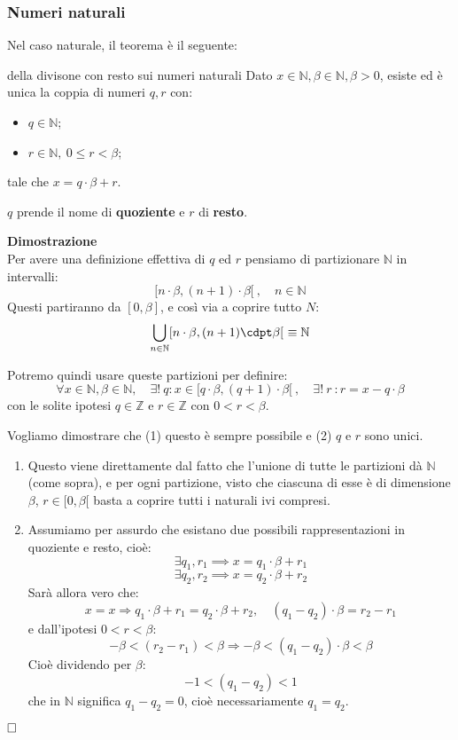 \documentclass[a4paper,11pt]{article}
\begin{document}
\subsubsection{Numeri naturali}
Nel caso naturale, il teorema è il seguente:
\begin{theorem}{della divisone con resto sui numeri naturali}
	Dato $x \in \mathbb{N}, \beta \in \mathbb{N}, \beta > 0$, esiste ed è unica la coppia di numeri $q,r$ con:
	\begin{itemize}
		\item $q \in \mathbb{N}$;
		\item $r \in \mathbb{N}, \ 0 \leq r < \beta$;
	\end{itemize}
	tale che $x = q \cdot \beta + r$.
\end{theorem}
$q$ prende il nome di \textbf{quoziente} e $r$ di \textbf{resto}.

\par\medskip
\noindent
\textbf{\textsf{Dimostrazione}} \\
Per avere una definizione effettiva di $q$ ed $r$ pensiamo di partizionare  $\mathbb{N}$ in intervalli:
$$
[n \cdot \beta, (n+1) \cdot \beta[ \ , \quad n \in \mathbb{N}
$$
Questi partiranno da $[0, \beta]$, e così via a coprire tutto $N$:
$$
\bigcup_{n \in \mathbb{N}} [n \cdot \beta, (n+1) \cdpt \beta[ \ \equiv \mathbb{N}
$$

Potremo quindi usare queste partizioni per definire:
$$ \forall x \in \mathbb{N}, \beta \in \mathbb{N}, \quad \exists ! \ q : x \in [ q \cdot \beta, (q+1) \cdot \beta [ \ , \quad \exists ! \ r \ : r = x - q \cdot \beta $$
con le solite ipotesi $q \in \mathbb{Z}$ e $r \in \mathbb{Z}$ con $0 < r < \beta$.

Vogliamo dimostrare che (1) questo è sempre possibile e (2) $q$ e $r$ sono unici.
\begin{enumerate}
	\item Questo viene direttamente dal fatto che l'unione di tutte le partizioni dà $\mathbb{N}$ (come sopra), e per ogni partizione, visto che ciascuna di esse è di dimensione $\beta$, $r \in [0, \beta[$ basta a coprire tutti i naturali ivi compresi.
	\item Assumiamo per assurdo che esistano due possibili rappresentazioni in quoziente e resto, cioè:
		$$
		\exists q_1, r_1 \implies x = q_1 \cdot \beta + r_1
		$$
		$$
		\exists q_2, r_2 \implies x = q_2 \cdot \beta + r_2
		$$
		Sarà allora vero che:
		$$
		x = x \Rightarrow  q_1 \cdot \beta + r_1 = 	q_2 \cdot \beta + r_2, \quad (q_1 - q_2) \cdot \beta = r_2 - r_1 $$
		e dall'ipotesi $0 < r < \beta$:
		$$ -\beta < (r_2 - r_1) < \beta \Rightarrow -\beta < (q_1 - q_2) \cdot \beta < \beta $$
		Cioè dividendo per $\beta$:
		$$ -1 < (q_1 - q_2) < 1 $$
		che in $\mathbb{N}$ significa $q_1 - q_2 = 0$, cioè necessariamente $q_1 = q_2$. 
\end{enumerate}
$\hfill\square$
\end{document}
